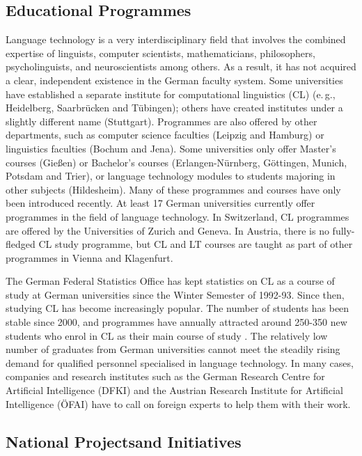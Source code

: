 \begin{multicols}{2}
\subsection{Educational Programmes}

Language technology is a very interdisciplinary field that involves the combined expertise of linguists, computer scientists, mathematicians, philosophers, psycholinguists, and neuroscientists among others. As a result, it has not acquired a clear, independent existence in the German faculty system. Some universities have established a separate institute for computational linguistics (CL) (e.\,g., Heidelberg, Saarbrücken and Tübingen); others have created institutes under a slightly different name (Stuttgart). Programmes are also offered by other departments, such as computer science faculties (Leipzig and Hamburg) or linguistics faculties (Bochum and Jena). Some universities only offer Master’s courses (Gießen) or Bachelor’s courses (Erlangen-Nürnberg, Göttingen, Munich, Potsdam and Trier), or language technology modules to students majoring in other subjects (Hildesheim). Many of these programmes and courses have only been introduced recently. At least 17 German universities currently offer programmes in the field of language technology. In Switzerland, CL programmes are offered by the Universities of Zurich and Geneva. In Austria, there is no fully-fledged CL study programme, but CL and LT courses are taught as part of other programmes in Vienna and Klagenfurt.

The German Federal Statistics Office has kept statistics on CL as a course of study at German universities since the Winter Semester of 1992-93. Since then, studying CL has become increasingly popular. The number of students has been stable since 2000, and programmes have annually attracted around 250-350 new students who enrol in CL as their main course of study \cite{wie1}. The relatively low number of graduates from German universities cannot meet the steadily rising demand for qualified personnel specialised in language technology. In many cases, companies and research institutes such as the German Research Centre for Artificial Intelligence (DFKI) and the Austrian Research Institute for Artificial Intelligence (ÖFAI) have to call on foreign experts to help them with their work.

\subsection[National Projects and Initiatives]{National Projects\newline and Initiatives}


\end{multicols}
